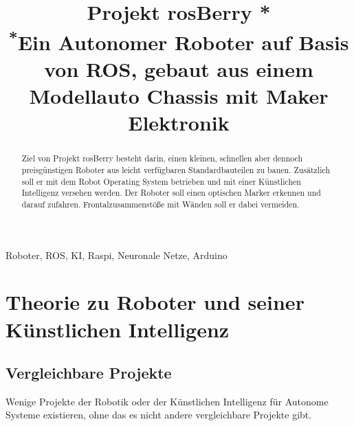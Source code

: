 \documentclass[conference]{IEEEtran}
\begin{document}
\title{Projekt rosBerry *\\
{\footnotesize \textsuperscript{*}Ein Autonomer Roboter auf Basis von ROS, gebaut aus einem Modellauto Chassis mit Maker Elektronik}}

\author{
%
\and
{}
\and
{}
}

\maketitle

\begin{abstract}
Ziel von Projekt rosBerry besteht darin, einen kleinen, schnellen aber dennoch preisgünstigen Roboter aus leicht verfügbaren Standardbauteilen zu bauen.
Zusätzlich soll er mit dem Robot Operating System betrieben und mit einer Künstlichen Intelligenz versehen werden.
Der Roboter soll einen optischen Marker erkennen und darauf zufahren.
Frontalzusammenstöße mit Wänden soll er dabei vermeiden.
\end{abstract}

\begin{IEEEkeywords}
Roboter, ROS, KI, Raspi, Neuronale Netze, Arduino
\end{IEEEkeywords}

\section{Theorie zu Roboter und seiner Künstlichen Intelligenz}

\subsection{Vergleichbare Projekte}	%
Wenige Projekte der Robotik oder der Künstlichen Intelligenz für Autonome Systeme existieren, ohne das es nicht andere vergleichbare Projekte gibt.
\\
\end{document}
